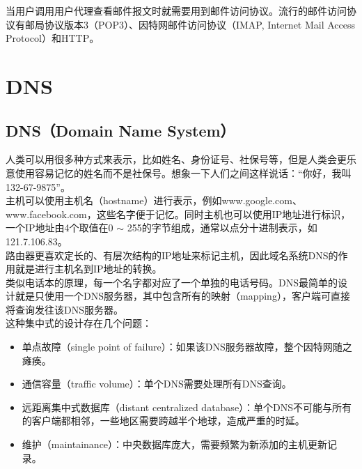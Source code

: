 \vspace{0.5cm}

当用户调用用户代理查看邮件报文时就需要用到邮件访问协议。流行的邮件访问协议有邮局协议版本3（POP3）、因特网邮件访问协议（IMAP, Internet Mail Access Protocol）和HTTP。

\newpage

\section{DNS}

\subsection{DNS（Domain Name System）}

人类可以用很多种方式来表示，比如姓名、身份证号、社保号等，但是人类会更乐意使用容易记忆的姓名而不是社保号。想象一下人们之间这样说话：“你好，我叫132-67-9875”。\\

主机可以使用主机名（hostname）进行表示，例如www.google.com、www.facebook.com，这些名字便于记忆。同时主机也可以使用IP地址进行标识，一个IP地址由4个取值在0 $ \sim $ 255的字节组成，通常以点分十进制表示，如121.7.106.83。\\

路由器更喜欢定长的、有层次结构的IP地址来标记主机，因此域名系统DNS的作用就是进行主机名到IP地址的转换。\\

类似电话本的原理，每一个名字都对应了一个单独的电话号码。DNS最简单的设计就是只使用一个DNS服务器，其中包含所有的映射（mapping），客户端可直接将查询发往该DNS服务器。\\

这种集中式的设计存在几个问题：

\begin{itemize}
    \item 单点故障（single point of failure）：如果该DNS服务器故障，整个因特网随之瘫痪。

    \item 通信容量（traffic volume）：单个DNS需要处理所有DNS查询。

    \item 远距离集中式数据库（distant centralized database）：单个DNS不可能与所有的客户端都相邻，一些地区需要跨越半个地球，造成严重的时延。

    \item 维护（maintainance）：中央数据库庞大，需要频繁为新添加的主机更新记录。
\end{itemize}

